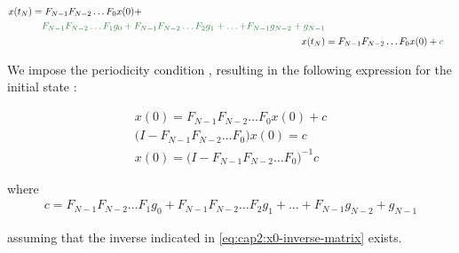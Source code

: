 \begin{align}
    \begin{split}
        x(t_N) &= F_{N-1}F_{N-2} \ldots F_0 x(0) + \\
        &\quad \green{F_{N-1}F_{N-2} \ldots F_1 g_0 + F_{N-1}F_{N-2} \ldots F_2 g_1 + \ldots +} \green{F_{N-1} g_{N-2} + g_{N-1}}
    \end{split} \nonumber \\
    x(t_N) &= F_{N-1} F_{N-2}\ldots F_0 x(0) + \green{c}
\end{align}

We impose the periodicity condition , resulting in the 
following expression for the initial state :

\noindent
\begin{align}
    x(0) = F_{N-1}F_{N-2} \ldots F_0 x(0) + c \nonumber \\
    \Big(I - F_{N-1}F_{N-2} \ldots F_0\Big) x(0) = c \nonumber \\
    x(0) = \Big(I - F_{N-1}F_{N-2} \ldots F_0\Big)^{-1} c
    \label{eq:cap2:x0-inverse-matrix}
\end{align}

\noindent
where
\begin{equation}
    \begin{split}
        c = F_{N-1}F_{N-2} \ldots F_1 g_0 + F_{N-1}F_{N-2} \ldots F_2 g_1 + \ldots + F_{N-1} g_{N-2} + g_{N-1}
    \end{split}
\end{equation}

\noindent
assuming that the inverse indicated in \eqref{eq:cap2:x0-inverse-matrix} exists.
